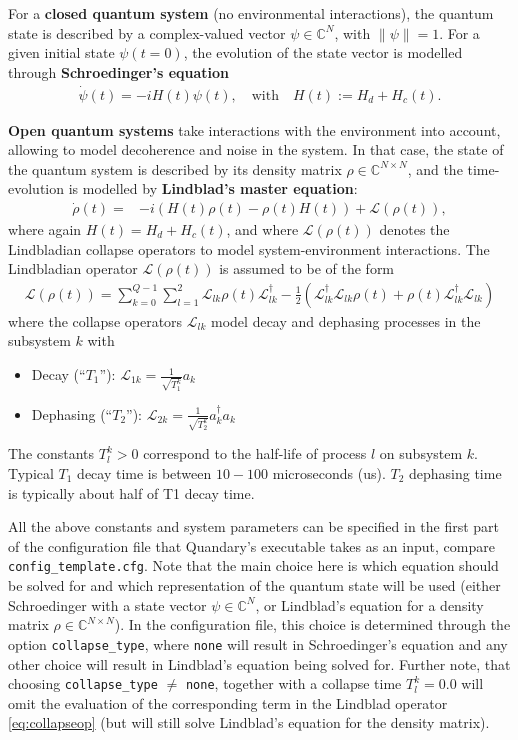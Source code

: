 \documentclass[11pt]{article}
\newcommand{\Ell}{\mathcal{L}}
\newcommand{\C}{\mathds{C}}
\begin{document}
For a \textbf{closed quantum system} (no environmental interactions), the quantum state is described by a complex-valued vector $\psi\in\C^N$, with $\|\psi\| = 1$. For a given initial state $\psi(t=0)$, the evolution of the state vector is modelled through \textbf{Schroedinger's equation}
\begin{align} \label{eq:schroedinger}
  \dot \psi(t)  = -i H(t) \psi(t), \quad \text{with} \quad  H(t) := H_d + H_c(t).
\end{align}

\textbf{Open quantum systems} take interactions with the environment into account, allowing to model decoherence and noise in the system. In that case, the state of the quantum system is described by its density matrix $\rho\in \C^{N\times N}$, and the time-evolution is modelled by \textbf{Lindblad's master equation}:
\begin{align}\label{mastereq}
  \dot \rho(t) = &-i(H(t)\rho(t) - \rho(t)H(t)) + \Ell(\rho(t)),
\end{align}
where again $H(t) = H_d + H_c(t)$, and where $\Ell(\rho(t))$ denotes the Lindbladian collapse operators to model system-environment interactions. The Lindbladian operator $\Ell(\rho(t))$ is assumed to be of the form 
\begin{align} \label{eq:collapseop}
  \Ell(\rho(t)) = \sum_{k=0}^{Q-1} \sum_{l=1}^2 \Ell_{lk} \rho(t)
  \Ell_{lk}^{\dagger} - \frac 1 2 \left( \Ell_{lk}^{\dagger}\Ell_{lk}
  \rho(t) + \rho(t)\Ell_{lk}^{\dagger} \Ell_{lk}\right)
\end{align}
where the collapse operators $\Ell_{lk}$ model decay and dephasing processes in the subsystem $k$ with 
\begin{itemize}
  \item  Decay  (``$T_1$''): $\Ell_{1k} = \frac{1}{\sqrt{T_1^k}} a_k$
  \item  Dephasing  (``$T_2$''): $\Ell_{2k} = \frac{1}{\sqrt{T_2^k}} a_k^{\dagger}a_k$ 
\end{itemize}
The constants $T_l^k>0$ correspond to the half-life of process $l$ on subsystem $k$. Typical $T_1$ decay time is between $10-100$ microseconds (us). $T_2$ dephasing time is typically about half of T1 decay time. 

All the above constants and system parameters can be specified in the first part of the configuration file that Quandary's executable takes as an input, compare \texttt{config\_template.cfg}. 
Note that the main choice here is which equation should be solved for and which representation of the quantum state will be used (either Schroedinger with a state vector $\psi \in \C^N$, or Lindblad's equation for a density matrix $\rho \in \C^{N\times N}$). In the configuration file, this choice is determined through the option \texttt{collapse\_type}, where \texttt{none} will result in Schroedinger's equation and any other choice will result in Lindblad's equation being solved for. Further note, that choosing \texttt{collapse\_type} $\neq$ \texttt{none}, together with a collapse time $T_{l}^k = 0.0$ will omit the evaluation of the corresponding term in the Lindblad operator \eqref{eq:collapseop} (but will still solve Lindblad's equation for the density matrix).
\end{document}
